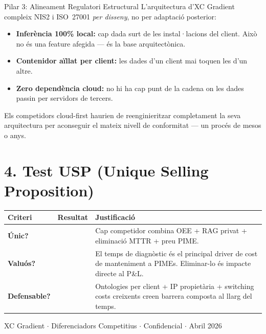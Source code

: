 \documentclass[11pt,a4paper]{article}
\newcommand{\yes}{\textcolor{checkgreen}{\textbf{\checkmark}}}
\begin{document}
\begin{moatbox}{Pilar 3: Alineament Regulatori Estructural}
L'arquitectura d'XC Gradient compleix NIS2 i ISO~27001 \textit{per disseny}, no per adaptació posterior:

\begin{itemize}[leftmargin=1.2em,itemsep=2pt]
\item \textbf{Inferència 100\% local:} cap dada surt de les instal·lacions del client. Això no és una feature afegida --- és la base arquitectònica.
\item \textbf{Contenidor aïllat per client:} les dades d'un client mai toquen les d'un altre.
\item \textbf{Zero dependència cloud:} no hi ha cap punt de la cadena on les dades passin per servidors de tercers.
\end{itemize}

Els competidors cloud-first haurien de reenginieritzar completament la seva arquitectura per aconseguir el mateix nivell de conformitat --- un procés de mesos o anys.
\end{moatbox}

\section{4. Test USP (Unique Selling Proposition)}

\begin{center}
\renewcommand{\arraystretch}{1.4}
\begin{tabularx}{0.92\textwidth}{l c X}
\toprule
\textbf{Criteri} & \textbf{Resultat} & \textbf{Justificació} \\
\midrule
\textbf{Únic?} & \yes & Cap competidor combina OEE + RAG privat + eliminació MTTR + preu PIME. \\
\textbf{Valuós?} & \yes & El temps de diagnòstic és el principal driver de cost de manteniment a PIMEs. Eliminar-lo és impacte directe al P\&L. \\
\textbf{Defensable?} & \yes & Ontologies per client + IP propietària + switching costs creixents creen barrera composta al llarg del temps. \\
\bottomrule
\end{tabularx}
\end{center}

\vfill
\begin{center}
\small\textcolor{midgray}{XC Gradient $\cdot$ Diferenciadors Competitius $\cdot$ Confidencial $\cdot$ Abril 2026}
\end{center}
\end{document}
